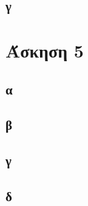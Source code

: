 \documentclass[12pt,a4paper]{article}
\begin{document}
  \subsection{γ}

  \section{Άσκηση 5}

  \subsection{α}
  
  \subsection{β}
  
  \subsection{γ}

  \subsection{δ}
\end{document}
